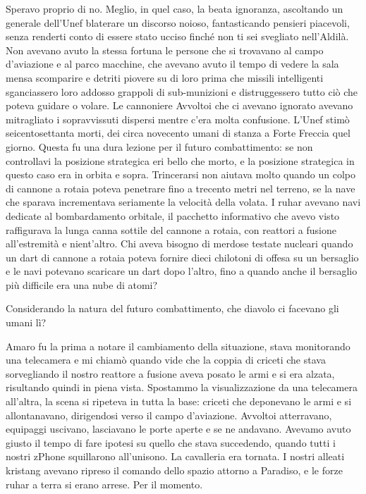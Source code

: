 Speravo proprio di no. Meglio, in quel caso, la beata ignoranza,
ascoltando un generale dell'Unef blaterare un discorso noioso,
fantasticando pensieri piacevoli, senza renderti conto di essere stato
ucciso finché non ti sei svegliato nell'Aldilà. Non avevano avuto la
stessa fortuna le persone che si trovavano al campo d'aviazione e al
parco macchine, che avevano avuto il tempo di vedere la sala mensa
scomparire e detriti piovere su di loro prima che missili intelligenti
sganciassero loro addosso grappoli di sub-munizioni e distruggessero
tutto ciò che poteva guidare o volare. Le cannoniere Avvoltoi che ci
avevano ignorato avevano mitragliato i sopravvissuti dispersi mentre
c'era molta confusione. L'Unef stimò seicentosettanta morti, dei circa
novecento umani di stanza a Forte Freccia quel giorno. Questa fu una
dura lezione per il futuro combattimento: se non controllavi la
posizione strategica eri bello che morto, e la posizione strategica in
questo caso era in orbita e sopra. Trincerarsi non aiutava molto quando
un colpo di cannone a rotaia poteva penetrare fino a trecento metri nel
terreno, se la nave che sparava incrementava seriamente la velocità
della volata. I ruhar avevano navi dedicate al bombardamento orbitale,
il pacchetto informativo che avevo visto raffigurava la lunga canna
sottile del cannone a rotaia, con reattori a fusione all'estremità e
nient'altro. Chi aveva bisogno di merdose testate nucleari quando un
dart di cannone a rotaia poteva fornire dieci chilotoni di offesa su un
bersaglio e le navi potevano scaricare un dart dopo l'altro, fino a
quando anche il bersaglio più difficile era una nube di atomi?

Considerando la natura del futuro combattimento, che diavolo ci facevano
gli umani lì?

Amaro fu la prima a notare il cambiamento della situazione, stava
monitorando una telecamera e mi chiamò quando vide che la coppia di
criceti che stava sorvegliando il nostro reattore a fusione aveva posato
le armi e si era alzata, risultando quindi in piena vista. Spostammo la
visualizzazione da una telecamera all'altra, la scena si ripeteva in
tutta la base: criceti che deponevano le armi e si allontanavano,
dirigendosi verso il campo d'aviazione. Avvoltoi atterravano, equipaggi
uscivano, lasciavano le porte aperte e se ne andavano. Avevamo avuto
giusto il tempo di fare ipotesi su quello che stava succedendo, quando
tutti i nostri zPhone squillarono all'unisono. La cavalleria era
tornata. I nostri alleati kristang avevano ripreso il comando dello
spazio attorno a Paradiso, e le forze ruhar a terra si erano arrese. Per
il momento.